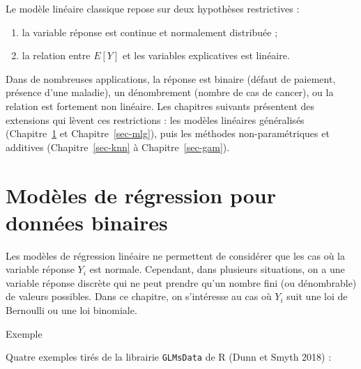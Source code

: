 \documentclass[
  french,
  letterpaper,
  DIV=11,
  numbers=noendperiod]{scrreprt}
\begin{document}
Le modèle linéaire classique repose sur deux hypothèses restrictives :

\begin{enumerate}
\def\labelenumi{\arabic{enumi}.}
\item
  la variable réponse est continue et normalement distribuée ;
\item
  la relation entre \(E[Y]\) et les variables explicatives est linéaire.
\end{enumerate}

Dans de nombreuses applications, la réponse est binaire (défaut de
paiement, présence d'une maladie), un dénombrement (nombre de cas de
cancer), ou la relation est fortement non linéaire. Les chapitres
suivants présentent des extensions qui lèvent ces restrictions : les
modèles linéaires généralisés (Chapitre~\ref{sec-logistique} et
Chapitre~\ref{sec-mlg}), puis les méthodes non-paramétriques et
additives (Chapitre~\ref{sec-knn} à Chapitre~\ref{sec-gam}).


\chapter{Modèles de régression pour données
binaires}\label{sec-logistique}

Les modèles de régression linéaire ne permettent de considérer que les
cas où la variable réponse \(Y_i\) est normale. Cependant, dans
plusieurs situations, on a une variable réponse discrète qui ne peut
prendre qu'un nombre fini (ou dénombrable) de valeurs possibles. Dans ce
chapitre, on s'intéresse au cas où \(Y_i\) suit une loi de Bernoulli ou
une loi binomiale.

{Exemple}

Quatre exemples tirés de la librairie \texttt{GLMsData} de R (Dunn et
Smyth 2018) :
\end{document}
